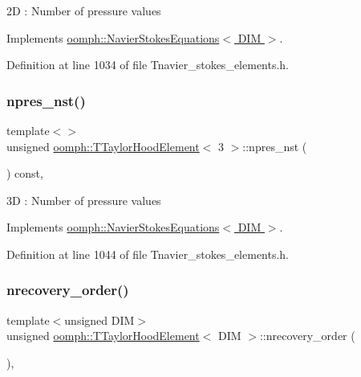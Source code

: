 2D \+: Number of pressure values 

Implements \hyperlink{classoomph_1_1NavierStokesEquations_a4a17a76873bf3131d1e0acc74fb1c2d8}{oomph\+::\+Navier\+Stokes\+Equations$<$ D\+I\+M $>$}.



Definition at line 1034 of file Tnavier\+\_\+stokes\+\_\+elements.\+h.

\mbox{\label{classoomph_1_1TTaylorHoodElement_a48bd219a6eb03eccd3c375b61204df36}} 
\subsubsection{\texorpdfstring{npres\+\_\+nst()}{npres\_nst()}\hspace{0.1cm}{\footnotesize\ttfamily [3/3]}}
{\footnotesize\ttfamily template$<$$>$ \\
unsigned \hyperlink{classoomph_1_1TTaylorHoodElement}{oomph\+::\+T\+Taylor\+Hood\+Element}$<$ 3 $>$\+::npres\+\_\+nst (\begin{DoxyParamCaption}{ }\end{DoxyParamCaption}) const\hspace{0.3cm}{\ttfamily [inline]}, {\ttfamily [virtual]}}

3D \+: Number of pressure values 

Implements \hyperlink{classoomph_1_1NavierStokesEquations_a4a17a76873bf3131d1e0acc74fb1c2d8}{oomph\+::\+Navier\+Stokes\+Equations$<$ D\+I\+M $>$}.



Definition at line 1044 of file Tnavier\+\_\+stokes\+\_\+elements.\+h.

\mbox{\label{classoomph_1_1TTaylorHoodElement_a132c8f850554a160cdc8d2afecb26b3a}} 
\subsubsection{\texorpdfstring{nrecovery\+\_\+order()}{nrecovery\_order()}}
{\footnotesize\ttfamily template$<$unsigned D\+IM$>$ \\
unsigned \hyperlink{classoomph_1_1TTaylorHoodElement}{oomph\+::\+T\+Taylor\+Hood\+Element}$<$ D\+IM $>$\+::nrecovery\+\_\+order (\begin{DoxyParamCaption}{ }\end{DoxyParamCaption})\hspace{0.3cm}{\ttfamily [inline]}, {\ttfamily [virtual]}}



